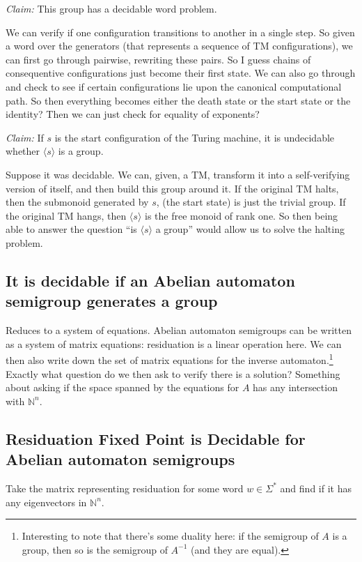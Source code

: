 \documentclass[10pt]{article}
\begin{document}
\textit{Claim:} This group has a decidable word problem.

We can verify if one configuration transitions to another in a single
step. So given a word over the generators (that represents a sequence
of TM configurations), we can first go through pairwise, rewriting
these pairs. So I guess chains of consequentive configurations just
become their first state. We can also go through and check to see if
certain configurations lie upon the canonical computational path. So
then everything becomes either the death state or the start state or
the identity? Then we can just check for equality of exponents?

\textit{Claim:} If $s$ is the start configuration of the Turing
machine, it is undecidable whether $\langle s \rangle$ is a group.

Suppose it was decidable. We can, given, a TM, transform it into a
self-verifying version of itself, and then build this group around
it. If the original TM halts, then the submonoid generated by $s$,
(the start state) is just the trivial group. If the original TM hangs,
then $\langle s \rangle$ is the free monoid of rank one. So then being
able to answer the question ``is $\langle s \rangle $ a group'' would
allow us to solve the halting problem.

\subsection{It is decidable if an Abelian automaton semigroup
  generates a group}

Reduces to a system of equations. Abelian automaton semigroups can be
written as a system of matrix equations: residuation is a linear
operation here. We can then also write down the set of matrix
equations for the inverse automaton.\footnote{Interesting to note that
  there's some duality here: if the semigroup of $A$ is a group, then
  so is the semigroup of $A^{-1}$ (and they are equal).}  Exactly what
question do we then ask to verify there is a solution? Something about
asking if the space spanned by the equations for $A$ has any
intersection with $\mathbb{N}^n$.


\subsection{Residuation Fixed Point is Decidable for Abelian automaton
  semigroups}

Take the matrix representing residuation for some word
$w \in \Sigma^*$ and find if it has any eigenvectors in
$\mathbb{N}^n$.
\end{document}
